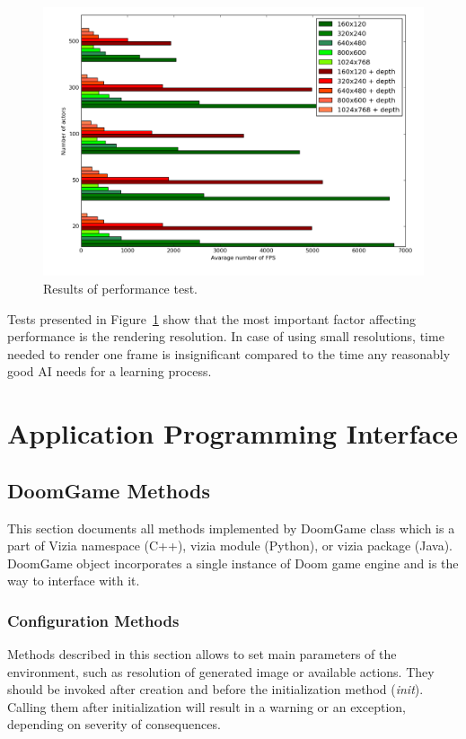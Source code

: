 \documentclass[english,bachelor,a4paper,twoside]{ppfcmthesis}
\begin{document}
\begin{figure}
\centering
\includegraphics[scale=0.5]{result_fps.png}
\caption{Results of performance test.}
\label{fig:fps_test}
\end{figure}

Tests presented in Figure~\ref{fig:fps_test} show that the most important factor affecting performance is the rendering resolution. In case of using small resolutions, time needed to render one frame is insignificant compared to the time any reasonably good AI needs for a learning process.



\chapter{Application Programming Interface}\label{ch:api}
\section{DoomGame Methods}\label{sec:methods}
	This section documents all methods implemented by DoomGame class which is a part of Vizia namespace (C++), vizia module (Python), or vizia package (Java). DoomGame object incorporates a single instance of Doom game engine and is the way to interface with it.
	\subsection{Configuration Methods}\label{subsec:config_methods}
	Methods described in this section allows to set main parameters of the environment, such as resolution of generated image or available actions. They should be invoked after creation and before the initialization method (\emph{init}). Calling them after initialization will result in a warning or an exception, depending on severity of consequences. 
	\vspace{20pt}
\end{document}
